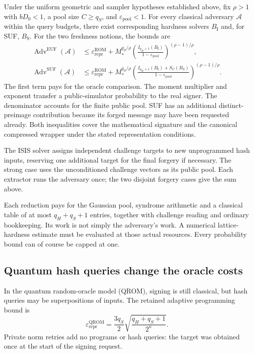 \documentclass[11pt,a4paper]{article}
\newcommand{\eps}{\varepsilon}
\theoremstyle{definition}
\theoremstyle{remark}
\numberwithin{equation}{section}
\begin{document}
Under the uniform geometric and sampler hypotheses established above, fix
$\rho>1$ with $bD_0<1$, a pool size $C\ge q_S$, and
$\eps_{\mathrm{pool}}<1$. For every classical adversary $\mathcal A$ within
the query budgets, there exist corresponding hardness solvers $B_{\mathrm I}$
and, for SUF, $B_{\mathrm S}$. For the two freshness notions, the bounds are
\begin{equation}
\begin{split}
 \operatorname{Adv}^{\mathrm{EUF}}(\mathcal A)
 &\le\eps_{\mathrm{repr}}^{\mathrm{ROM}}+
 M_*^{q_S/\rho}
 \left(\frac{I_{q_H+1}(B_{\mathrm I})}
 {1-\eps_{\mathrm{pool}}}\right)^{(\rho-1)/\rho},\\
 \operatorname{Adv}^{\mathrm{SUF}}(\mathcal A)
 &\le\eps_{\mathrm{repr}}^{\mathrm{ROM}}+
 M_*^{q_S/\rho}
 \left(\frac{I_{q_H+1}(B_{\mathrm I})+S_C(B_{\mathrm S})}
 {1-\eps_{\mathrm{pool}}}\right)^{(\rho-1)/\rho}.
\end{split}
\label{eq:complete-rom-security}
\end{equation}
The first term pays for the oracle comparison. The moment multiplier and
exponent transfer a public-simulator probability to the real signer. The
denominator accounts for the finite public pool. SUF has an additional
distinct-preimage contribution because its forged message may have been
requested already. Both inequalities cover the mathematical signature and
the canonical compressed wrapper under the stated representation conditions.

The ISIS solver assigns independent challenge targets to new unprogrammed
hash inputs, reserving one additional target for the final forgery if
necessary. The strong case uses the unconditioned challenge vectors as
its public pool. Each extractor runs the adversary once; the two disjoint forgery cases
give the sum above.

Each reduction pays for the Gaussian pool, syndrome arithmetic and a
classical table of at most $q_H+q_S+1$ entries, together with challenge
reading and ordinary bookkeeping. Its work is not simply the adversary's
work. A numerical lattice-hardness estimate must be evaluated at those
actual resources. Every probability bound can of course be capped at one.

\subsection{Quantum hash queries change the oracle costs}

In the quantum random-oracle model (QROM), signing is still classical, but hash
queries may be superpositions of inputs. The retained adaptive programming
bound is
\begin{equation}
 \eps_{\mathrm{repr}}^{\mathrm{QROM}}
 =\frac{3q_S}{2}\sqrt{\frac{q_H+q_S+1}{2^\kappa}}.
 \label{eq:qrom-reprogram}
\end{equation}
Private norm retries add no programs or hash queries: the target was
obtained once at the start of the signing request.
\end{document}
